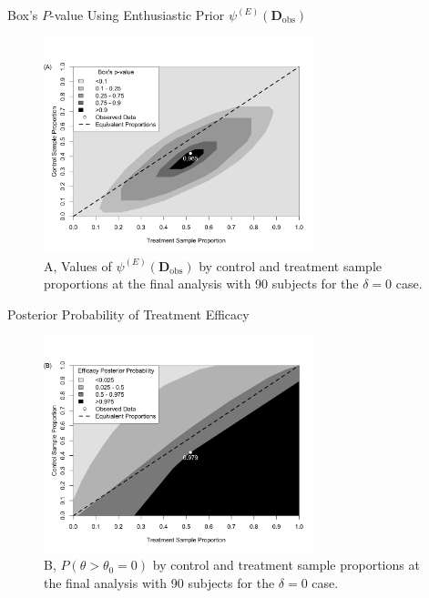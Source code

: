 \documentclass{beamer}
\begin{document}
\begin{frame}{Box's $P$-value Using Enthusiastic Prior $\psi^{(E)}(\mathbf{D}_{\text{obs}})$ }

\vspace{-0.3cm}
\begin{figure}[htbp]
\begin{center}
\includegraphics[width=0.7\textwidth]{./figures/2dbayesp.png}
    \caption{A, Values of $\psi^{(E)}(\mathbf{D}_{\text{obs}})$ by control and treatment sample proportions at the final analysis with 90 subjects for the $\delta=0$ case.}
\label{fig:2dheatmaps}
 \end{center}
\end{figure}
\end{frame}

\begin{frame}{Posterior Probability of Treatment Efficacy}

\vspace{-0.3cm}
\begin{figure}[htbp]
\begin{center}
\includegraphics[width=0.7\textwidth]{./figures/2dpostp.png}
    \caption{B, $P(\theta>\theta_0=0)$ by control and treatment sample proportions at the final analysis with 90 subjects for the $\delta=0$ case.}
\label{fig:2dheatmaps}
 \end{center}
\end{figure}
\end{frame}
\end{document}
